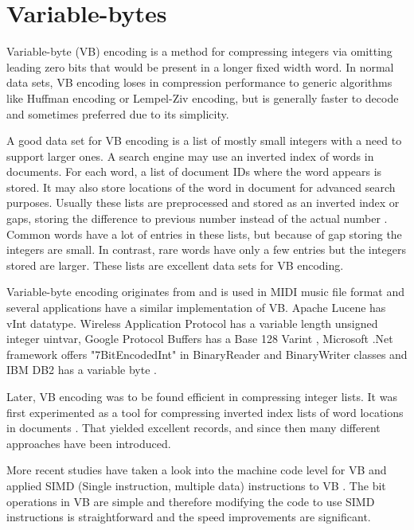 \chapter{Variable-bytes}

Variable-byte (VB) encoding \citep{Wil99} is a method for compressing integers via omitting leading zero bits that would be present in a longer fixed 
width word. In normal data sets, VB encoding loses in compression performance to generic algorithms like Huffman encoding or Lempel-Ziv encoding, but 
is generally faster to decode \citep{Bri09} and sometimes preferred due to its simplicity. 

A good data set for VB encoding is a list of mostly small integers with a need to support larger ones. A search engine may use an inverted index of 
words in documents. For each word, a list of document IDs where the word appears is stored. It may also store locations of the word in document for 
advanced search purposes. Usually these lists are preprocessed and stored as an inverted index or gaps, storing the difference to previous number 
instead of the actual number \citep{Man08}. Common words have a lot of entries in these lists, but because of gap storing the integers are small. 
In contrast, rare words have only a few entries but the integers stored are larger. These lists are excellent data sets for VB encoding. 

Variable-byte encoding originates from and is used in MIDI music file format \citep{Mid96} and several applications have a similar implementation of VB. Apache 
Lucene has vInt datatype. Wireless Application Protocol has a variable length unsigned integer uintvar, Google Protocol Buffers has a Base 128 Varint \citep{GooPB},
 Microsoft .Net framework offers "7BitEncodedInt" in BinaryReader and BinaryWriter classes and IBM DB2 has a variable byte  \citep{Bha09}.

Later, VB encoding was to 
be found efficient in compressing integer lists. It was first experimented as a tool for compressing inverted index lists of word locations in documents \citep{Sch02}. 
That yielded excellent records, and since then many different approaches have been introduced. 

More recent studies have taken a look into the machine code level for VB and applied SIMD (Single instruction, multiple data) instructions to VB \citep{Lem18,Pla15}. The bit 
operations in VB are simple and therefore modifying the code to use SIMD instructions is straightforward and the speed improvements are significant. 

